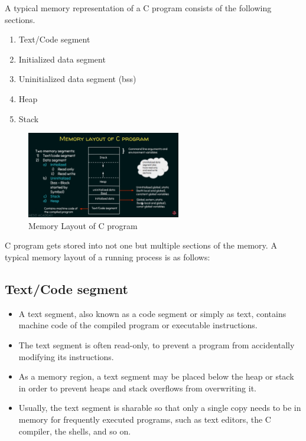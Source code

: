 
    A typical memory representation of a C program consists of the following sections.
    \begin{enumerate}
        \item Text/Code segment  
        \item Initialized data segment 
        \item Uninitialized data segment  (bss)
        \item Heap 
        \item Stack
    \end{enumerate}

    \begin{figure}[H]
        \begin{center}
            \includegraphics[width=0.6\textwidth]{images/memoryLayoutC.png}
            \caption{Memory Layout of C program}
            \label{memoryLayoutC}
        \end{center}
    \end{figure}

    C program gets stored into not one but multiple sections of the memory. A typical memory layout of a running process is as follows:
    \subsection{Text/Code segment}
    \begin{itemize}
        \item A text segment, also known as a code segment or simply as text, contains machine code of the compiled program or executable instructions.
        \item The text segment is often read-only, to prevent a program from accidentally modifying its instructions.        
        \item As a memory region, a text segment may be placed below the heap or stack in order to prevent heaps and stack overflows from overwriting it.         
        \item Usually, the text segment is sharable so that only a single copy needs to be in memory for frequently executed programs, such as text editors, the C compiler, the shells, and so on. 
    \end{itemize}   
    
